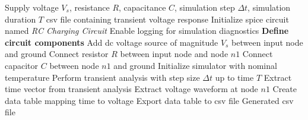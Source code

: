 \begin{algorithm}
\caption{\gls{rc} Circuit Transient Simulation and Data Export}
\label{algo:rc-transient-simulation}
\begin{algorithmic}
\Require Supply voltage $V_s$, resistance $R$, capacitance $C$, simulation step $\Delta t$, simulation duration $T$
\Ensure \gls{csv} file containing transient voltage response
\State Initialize \gls{spice} circuit named \textit{RC Charging Circuit}
\State Enable logging for simulation diagnostics
\State \textbf{Define circuit components}
\State Add \gls{dc} voltage source of magnitude $V_s$ between input node and ground
\State Connect resistor $R$ between input node and node $n1$
\State Connect capacitor $C$ between node $n1$ and ground
\State Initialize simulator with nominal temperature
\State Perform transient analysis with step size $\Delta t$ up to time $T$
\State Extract time vector from transient analysis
\State Extract voltage waveform at node $n1$
\State Create data table mapping time to voltage
\State Export data table to \gls{csv} file
\State \Return Generated \gls{csv} file
\end{algorithmic}
\end{algorithm}

